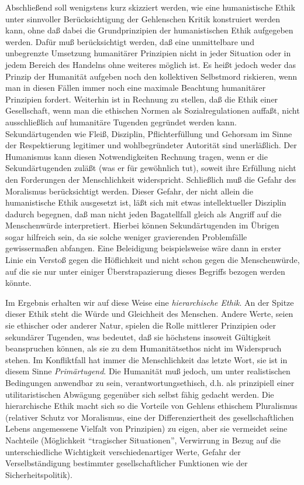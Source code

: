 \documentclass[12pt,a4paper]{article}
\begin{document}
Abschließend soll wenigstens kurz skizziert werden, wie eine humanistische
Ethik unter sinnvoller Berücksichtigung der Gehlenschen Kritik konstruiert
werden kann, ohne daß dabei die Grundprinzipien
der humanistischen Ethik aufgegeben werden. Dafür muß berücksichtigt
werden, daß eine unmittelbare und unbegrenzte Umsetzung humanitärer
Prinzipien nicht in jeder Situation oder in jedem Bereich des Handelns ohne
weiteres möglich ist. Es heißt jedoch weder das Prinzip der Humanität
aufgeben noch den kollektiven Selbstmord riskieren, wenn man in diesen
Fällen immer noch eine maximale Beachtung humanitärer Prinzipien fordert.
Weiterhin ist in Rechnung zu stellen, daß die Ethik einer Gesellschaft, wenn
man die ethischen Normen als Sozialregulationen auffaßt, nicht
ausschließlich auf humanitäre Tugenden gegründet werden kann.
Sekundärtugenden wie Fleiß, Disziplin, Pflichterfüllung und Gehorsam im
Sinne der Respektierung legitimer und wohlbegründeter Autorität sind
unerläßlich. Der Humanismus kann diesen Notwendigkeiten Rechnung tragen,
wenn er die Sekundärtugenden zuläßt (was er für gewöhnlich tut), soweit
ihre Erfüllung nicht den Forderungen der Menschlichkeit widerspricht.
Schließlich muß die Gefahr des Moralismus berücksichtigt werden. Dieser
Gefahr, der nicht allein die humanistische Ethik ausgesetzt ist, läßt sich
mit etwas intellektueller Disziplin dadurch begegnen, daß man nicht jeden
Bagatellfall gleich als Angriff auf die Menschenwürde interpretiert. Hierbei
können Sekundärtugenden im Übrigen sogar hilfreich sein, da sie solche
weniger gravierenden Problemfälle gewissermaßen abfangen. Eine Beleidigung
beispielsweise wäre dann in erster Linie ein Verstoß gegen die Höflichkeit
und nicht schon gegen die Menschenwürde, auf die sie nur unter einiger
Überstrapazierung dieses Begriffs bezogen werden könnte.

Im Ergebnis erhalten wir auf diese Weise eine {\em hierarchische Ethik}. An
der Spitze dieser Ethik steht die Würde und Gleichheit des Menschen. Andere
Werte, seien sie ethischer oder anderer Natur, spielen die Rolle mittlerer
Prinzipien oder sekundärer Tugenden, was bedeutet, daß sie höchstens
insoweit Gültigkeit beanspruchen können, als sie zu dem Humanitätsethos
nicht im Widerspruch stehen. Im Konfliktfall hat immer die Menschlichkeit das
letzte Wort, sie ist in diesem Sinne {\em Primärtugend}. Die Humanität muß
jedoch, um unter realistischen Bedingungen anwendbar zu sein,
verantwortungsethisch, d.h. als prinzipiell einer utilitaristischen Abwägung
gegenüber sich selbst fähig gedacht werden. Die hierarchische Ethik macht
sich so die Vorteile von Gehlens ethischem Pluralismus (relativer Schutz vor
Moralismus, eine der Differenziertheit des gesellschaftlichen Lebens
angemessene Vielfalt von Prinzipien) zu eigen, aber sie vermeidet seine
Nachteile (Möglichkeit "`tragischer Situationen"', Verwirrung in Bezug auf
die unterschiedliche Wichtigkeit verschiedenartiger Werte, Gefahr der
Verselbständigung bestimmter gesellschaftlicher Funktionen wie der
Sicherheitspolitik).
\end{document}
